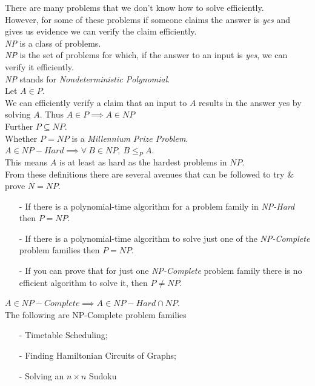 \documentclass[11pt,a4paper]{article}
\begin{document}
There are many problems that we don't know how to solve efficiently.\\
However, for some of these problems if someone claims the answer is \textit{yes} and gives us evidence we can verify the claim efficiently.\\

\textit{NP} is a class of problems.\\
\textit{NP} is the set of problems for which, if the answer to an input is \textit{yes}, we can verify it efficiently.\\
\nb \textit{NP} stands for \textit{Nondeterministic Polynomial}.\\

Let $A\in P$.\\
We can efficiently verify a claim that an input to $A$ results in the answer yes by solving $A$.
Thus $A\in P\implies A\in NP$\\
Further $P\subseteq NP$.\\
\nb Whether $P=NP$ is a \textit{Millennium Prize Problem}.\\

\newpage
{}
$A\in NP-Hard\implies\forall\ B\in NP,\ B\leq_PA$.\\
This means $A$ is at least as hard as the hardest problems in $NP$.\\

From these definitions there are several avenues that can be followed to try \& prove $N=NP$.
\begin{itemize}
	\item[-] If there is a polynomial-time algorithm for a problem family in \textit{NP-Hard} then $P=NP$.
	\item[-] If there is a polynomial-time algorithm to solve just one of the \textit{NP-Complete} problem families then $P=NP$.
	\item[-] If you can prove that for just one \textit{NP-Complete} problem family there is no efficient algorithm to solve it, then $P\neq NP$.
\end{itemize}

$A\in NP-Complete\implies A\in NP-Hard\cap NP$.\\

The following are NP-Complete problem families
\begin{itemize}
	\item[-] Timetable Scheduling;
	\item[-] Finding Hamiltonian Circuits of Graphs;
	\item[-] Solving an $n\times n$ Sudoku
\end{itemize}
\end{document}
